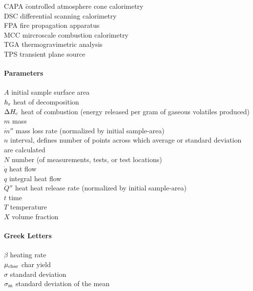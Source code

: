\documentclass{book}
\begin{document}
\begin{tabbing}
CAPA		\hspace{1in}\= controlled atmosphere cone calorimetry\\
DSC					\>differential scanning calorimetry\\
FPA		        		\> fire propagation apparatus\\
MCC		        		\> mircroscale combustion calorimetry\\
TGA		        		\> thermogravimetric analysis\\
TPS		        		\> transient plane source\\

\hspace{0.1in}            		\> \\
{\bf  Parameters}       	\> \\
\hspace{0.1in} 		       	\> \\
$A$		        			\> initial sample surface area\\
$h_{\rm r}$        	\> heat of decomposition\\
$\Delta H_{\rm c}$		\> heat of combustion (energy released per gram of gaseous volatiles produced)\\
$m$		        			\> mass\\
$\dot{m}''$			\> mass loss rate (normalized by initial sample-area)\\
$n$						\> interval, defines number of points across which  average or standard deviation are calculated\\
$N$		        			\> number (of measurements, tests, or test locations)\\
$\dot{q}$		     		\> heat flow\\
$q$		        			\> integral heat flow\\
$\dot{Q}''$			\> heat heat release rate (normalized by initial sample-area)\\
$t$						\> time\\
$T$						\> temperature \\
$X$               				\> volume fraction \\

\hspace{0.1in}            		\> \\
{\bf Greek Letters}       	\> \\
\hspace{0.1in}            		\> \\
$\beta$                  		\> heating rate\\
$\mu_{\rm char}$		\> char yield\\
$\sigma$			   		\> standard deviation\\
$\sigma_{\rm m}$   	 	\> standard deviation of the mean \\


\end{tabbing}
\end{document}
